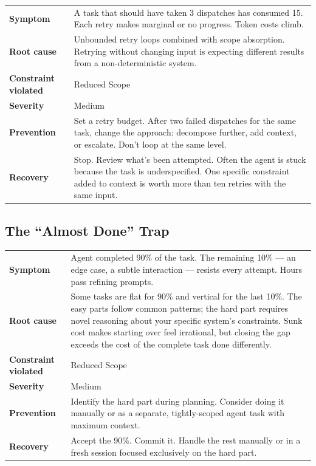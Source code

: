 \documentclass[
  a4paper,
  DIV=11,
  numbers=noendperiod]{scrreprt}
\newcounter{none} %
\begin{document}
{\def\LTcaptype{none} %
\begin{longtable}[]{@{}
  >{\raggedright\arraybackslash}p{}
  >{\raggedright\arraybackslash}p{}@{}}
\toprule\noalign{}
\endhead
\bottomrule\noalign{}
\endlastfoot
\textbf{Symptom} & A task that should have taken 3 dispatches has
consumed 15. Each retry makes marginal or no progress. Token costs
climb. \\
\textbf{Root cause} & Unbounded retry loops combined with scope
absorption. Retrying without changing input is expecting different
results from a non-deterministic system. \\
\textbf{Constraint violated} & Reduced Scope \\
\textbf{Severity} & Medium \\
\textbf{Prevention} & Set a retry budget. After two failed dispatches
for the same task, change the approach: decompose further, add context,
or escalate. Don't loop at the same level. \\
\textbf{Recovery} & Stop. Review what's been attempted. Often the agent
is stuck because the task is underspecified. One specific constraint
added to context is worth more than ten retries with the same input. \\
\end{longtable}
}

\subsection{The ``Almost Done'' Trap}\label{the-almost-done-trap}

{\def\LTcaptype{none} %
\begin{longtable}[]{@{}
  >{\raggedright\arraybackslash}p{}
  >{\raggedright\arraybackslash}p{}@{}}
\toprule\noalign{}
\endhead
\bottomrule\noalign{}
\endlastfoot
\textbf{Symptom} & Agent completed 90\% of the task. The remaining 10\%
--- an edge case, a subtle interaction --- resists every attempt. Hours
pass refining prompts. \\
\textbf{Root cause} & Some tasks are flat for 90\% and vertical for the
last 10\%. The easy parts follow common patterns; the hard part requires
novel reasoning about your specific system's constraints. Sunk cost
makes starting over feel irrational, but closing the gap exceeds the
cost of the complete task done differently. \\
\textbf{Constraint violated} & Reduced Scope \\
\textbf{Severity} & Medium \\
\textbf{Prevention} & Identify the hard part during planning. Consider
doing it manually or as a separate, tightly-scoped agent task with
maximum context. \\
\textbf{Recovery} & Accept the 90\%. Commit it. Handle the rest manually
or in a fresh session focused exclusively on the hard part. \\
\end{longtable}
}
\end{document}
